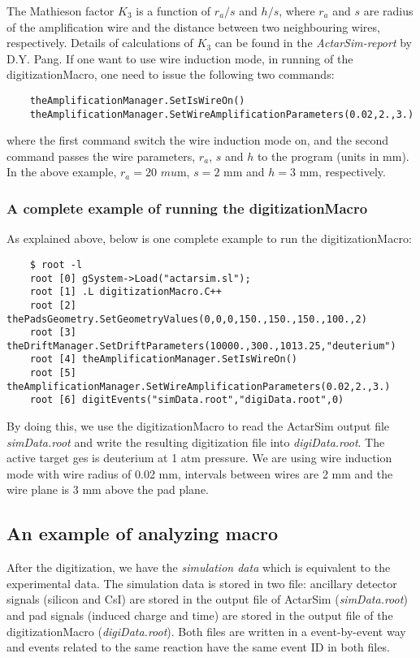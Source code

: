 The Mathieson factor $K_3$ is a function of $r_a/s$ and $h/s$, where $r_a$ and $s$ are radius of the amplification wire and the distance between two neighbouring wires, respectively. Details of calculations of $K_3$ can be found in the \textit{ActarSim-report} by D.Y. Pang. If one want to use wire induction mode, in running of the digitizationMacro, one need to issue the following two commands:
\begin{verbatim}
    theAmplificationManager.SetIsWireOn()
    theAmplificationManager.SetWireAmplificationParameters(0.02,2.,3.)
\end{verbatim}
where the first command switch the wire induction mode on, and the second command passes the wire parameters, $r_a$, $s$ and $h$ to the program (units in mm). In the above example, $r_a=20$ $mu$m, $s=2$ mm and $h=3$ mm, respectively.

\subsubsection{A complete example of running the digitizationMacro}
As explained above, below is one complete example to run the digitizationMacro:
\begin{verbatim}
    $ root -l
    root [0] gSystem->Load("actarsim.sl");
    root [1] .L digitizationMacro.C++
    root [2] thePadsGeometry.SetGeometryValues(0,0,0,150.,150.,150.,100.,2)
    root [3] theDriftManager.SetDriftParameters(10000.,300.,1013.25,"deuterium")
    root [4] theAmplificationManager.SetIsWireOn()
    root [5] theAmplificationManager.SetWireAmplificationParameters(0.02,2.,3.)
    root [6] digitEvents("simData.root","digiData.root",0)
\end{verbatim}
By doing this, we use the digitizationMacro to read the ActarSim output file \textit{simData.root} and write the resulting digitization file into \textit{digiData.root}. The active target ges is deuterium at 1 atm pressure. We are using wire induction mode with wire radius of 0.02 mm, intervals between wires are 2 mm and the wire plane is 3 mm above the pad plane.

\subsection{An example of analyzing macro}
After the digitization, we have the \textit{simulation data} which is equivalent to the experimental data. The simulation data is stored in two file: ancillary detector signals (silicon and CsI) are stored in the output file of ActarSim (\textit{simData.root}) and pad signals (induced charge and time) are stored in the output file of the digitizationMacro (\textit{digiData.root}). Both files are written in a event-by-event way and events related to the same reaction have the same event ID in both files.

